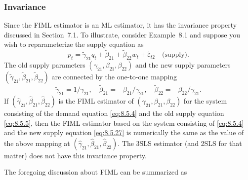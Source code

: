 \subsubsection*{Invariance}

Since the FIML estimator is an ML estimator, it has the invariance property discussed in Section~7.1. To illustrate, consider Example~8.1 and suppose you wish to
reparameterize the supply equation as
\begin{equation}
  p_t = \tilde{\gamma}_{21} q_t + \tilde{\beta}_{21}
  + \tilde{\beta}_{22} w_t + \tilde{\varepsilon}_{t2}
  \quad \text{(supply)}.
  \label{eq:8.5.27} \tag{8.5.27}
\end{equation}
The old supply parameters $(\gamma_{21}, \beta_{21}, \beta_{22})$ and the new supply parameters
$(\tilde{\gamma}_{21}, \tilde{\beta}_{21}, \tilde{\beta}_{22})$ are connected by the one-to-one mapping
\begin{equation}
  \tilde{\gamma}_{21} = 1/\gamma_{21}, \quad
  \tilde{\beta}_{21} = -\beta_{21}/\gamma_{21}, \quad
  \tilde{\beta}_{22} = -\beta_{22}/\gamma_{21}.
  \label{eq:8.5.28} \tag{8.5.28}
\end{equation}
If $(\hat{\gamma}_{21}, \hat{\beta}_{21}, \hat{\beta}_{22})$ is the FIML estimator of
$(\gamma_{21}, \beta_{21}, \beta_{22})$ for the system consisting
of the demand equation \eqref{eq:8.5.4} and the old supply equation \eqref{eq:8.5.5}, then the FIML
estimator based on the system consisting of \eqref{eq:8.5.4} and the new supply equation
\eqref{eq:8.5.27}
is numerically the same as the value of the above mapping at
$(\hat{\gamma}_{21}, \hat{\beta}_{21}, \hat{\beta}_{22})$. The
3SLS estimator (and 2SLS for that matter) does not have this invariance property.

The foregoing discussion about FIML can be summarized as

